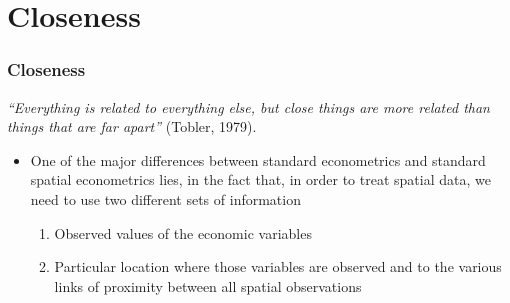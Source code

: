 \documentclass[
  shownotes,
  xcolor={svgnames},
  hyperref={colorlinks,citecolor=DarkBlue,linkcolor=DarkRed,urlcolor=DarkBlue}
  ]{beamer}
\begin{document}
\section{Closeness }
\begin{frame}[fragile]
\frametitle{Closeness}

 {\it “Everything is related to everything else, but close things are more related than things that are far apart”} (Tobler, 1979).

\bigskip

\begin{itemize}
  \item One of the major differences between standard econometrics and standard spatial econometrics lies, in the fact that, in order to treat spatial data, we need to use two different sets of information
  \medskip
  \begin{enumerate}
  \item Observed values of the economic variables
  \medskip
  \item Particular location where those variables are observed and to the various links of proximity between all spatial observations
  \end{enumerate}
\end{itemize}

\end{frame}
\end{document}
